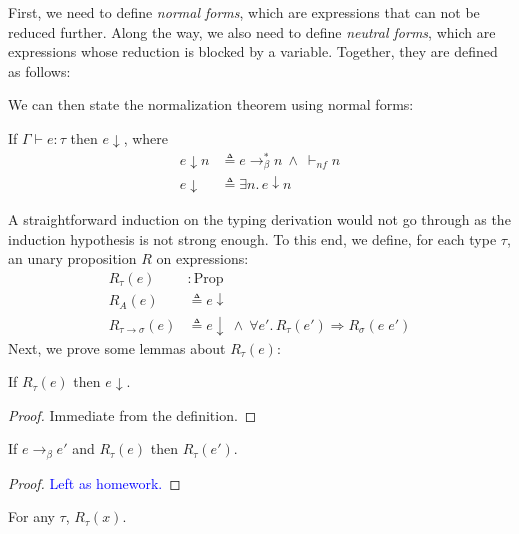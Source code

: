 \documentclass{notes}
\begin{document}
First, we need to define \emph{normal forms}, which are expressions that can not be reduced further.
%
Along the way, we also need to define \emph{neutral forms}, which are expressions whose reduction is blocked by a variable.
%
Together, they are defined as follows:
%
%
We can then state the normalization theorem using normal forms:
%
\begin{thm}[Normalization]
  If $\Gamma \vdash e : \tau$ then $e \downarrow$, where
  \begin{align*}
    e \downarrow n & \triangleq e \longrightarrow_{\beta}^* n \ \wedge \ \vdash_{nf} n \\
    e \downarrow   & \triangleq \exists n.\, e \downarrow n
  \end{align*}
\end{thm}
%
\noindent A straightforward induction on the typing derivation would not go through as the induction hypothesis is not strong enough.
%
To this end, we define, for each type $\tau$, an unary proposition $R$ on expressions:
%
\begin{align*}
  R_{\tau}(e)                 & : \mathrm{Prop} \\
  R_{A}(e)                    & \triangleq e \downarrow \\
  R_{\tau \rightarrow \sigma}(e) & \triangleq e \downarrow \ \wedge \ \forall e'.\, R_{\tau}(e') \Longrightarrow R_{\sigma}(e \; e')
\end{align*}
Next, we prove some lemmas about $R_{\tau}(e)$:
%
\begin{lem} \label{lem1}
  If $R_{\tau}(e)$ then $e \downarrow$.
\end{lem}
%
\begin{proof}
  Immediate from the definition.
\end{proof}
%
\begin{lem}
  If $e \rightarrow_{\beta} e'$ and $R_{\tau}(e)$ then $R_{\tau}(e')$.
\end{lem}
%
\begin{proof}
  \textcolor{blue}{Left as homework.}
\end{proof}
%
\begin{lem} \label{lem3}
  For any $\tau$, $R_{\tau}(x)$.
\end{lem}
\end{document}
